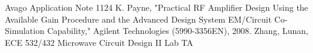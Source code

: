 \documentclass[conference]{IEEEtran}
\begin{document}
\begin{thebibliography}{1}
Avago Application Note 1124
K. Payne, "Practical RF Amplifier Design Using the Available Gain Procedure and the Advanced Design System EM/Circuit Co-Simulation Capability," Agilent Technologies (5990-3356EN), 2008.
Zhang, Lunan, ECE 532/432 Microwave Circuit Design II Lab TA
\end{thebibliography}
\end{document}
